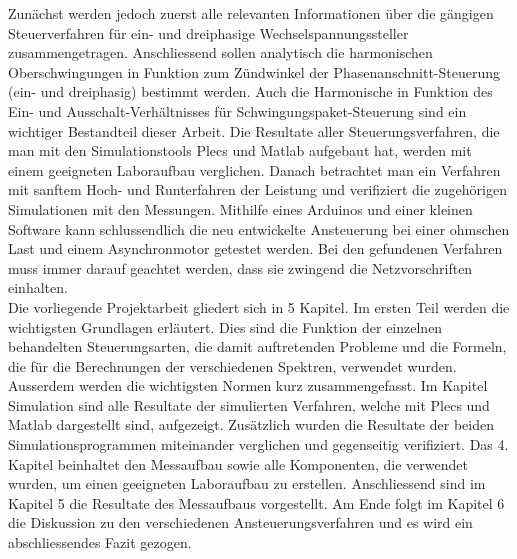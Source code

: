 Zunächst werden jedoch zuerst alle relevanten Informationen über die gängigen Steuerverfahren für ein- und dreiphasige Wechselspannungssteller zusammengetragen. Anschliessend sollen analytisch die harmonischen Oberschwingungen in Funktion zum Zündwinkel der Phasenanschnitt-Steuerung (ein- und dreiphasig) bestimmt werden. Auch die Harmonische in Funktion des Ein- und Ausschalt-Verhältnisses für Schwingungspaket-Steuerung sind ein wichtiger Bestandteil dieser Arbeit. Die Resultate aller Steuerungsverfahren, die man mit den Simulationstools Plecs und Matlab aufgebaut hat, werden mit einem geeigneten Laboraufbau verglichen. Danach betrachtet man ein Verfahren mit sanftem Hoch- und Runterfahren der Leistung und verifiziert die zugehörigen Simulationen mit den Messungen. Mithilfe eines Arduinos und einer kleinen Software kann schlussendlich die neu entwickelte Ansteuerung bei einer ohmschen Last und einem Asynchronmotor getestet werden. Bei den gefundenen Verfahren muss immer darauf geachtet werden, dass sie zwingend die Netzvorschriften einhalten.\\
Die vorliegende Projektarbeit gliedert sich in 5 Kapitel. Im ersten Teil werden die wichtigsten Grundlagen erläutert. Dies sind die Funktion der einzelnen behandelten Steuerungsarten, die damit auftretenden Probleme und die Formeln, die für die Berechnungen der verschiedenen Spektren, verwendet wurden. Ausserdem werden die wichtigsten Normen kurz zusammengefasst. Im Kapitel Simulation sind alle Resultate der simulierten Verfahren, welche mit Plecs und Matlab dargestellt sind, aufgezeigt. Zusätzlich wurden die Resultate der beiden Simulationsprogrammen miteinander verglichen und gegenseitig verifiziert. Das 4. Kapitel beinhaltet den Messaufbau sowie alle Komponenten, die verwendet wurden, um einen geeigneten Laboraufbau zu erstellen. Anschliessend sind im Kapitel 5 die Resultate des Messaufbaus vorgestellt. Am Ende folgt im Kapitel 6 die Diskussion zu den verschiedenen Ansteuerungsverfahren und es wird ein abschliessendes Fazit gezogen.





















